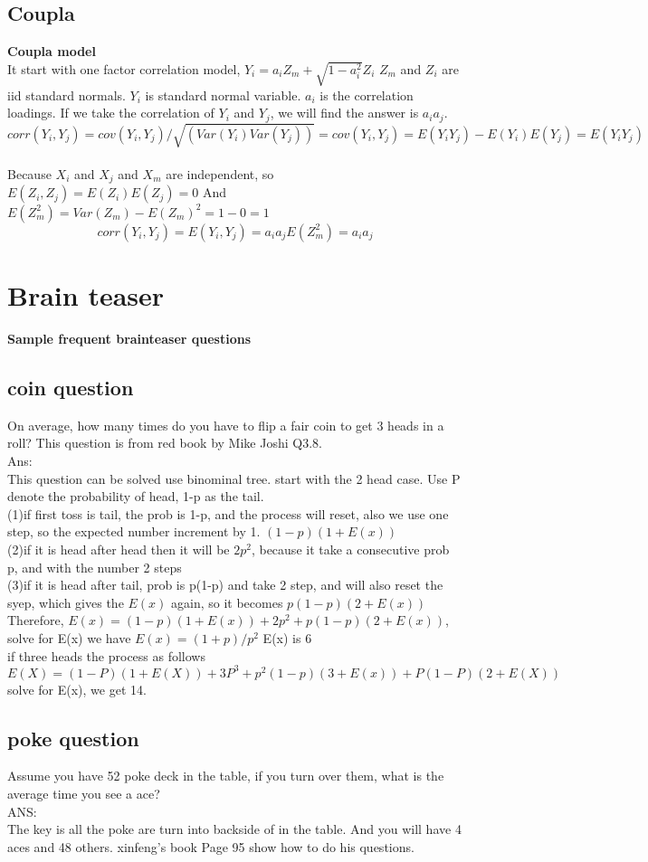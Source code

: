 \documentclass[a4paper,11pt]{article}
\begin{document}
\subsection{Coupla}
{\bf Coupla model}\\
It start with one factor correlation model, $Y_i=a_iZ_m+\sqrt {1-a_i^2}Z_i$ $Z_m$ and $Z_i$ are iid standard normals.
$Y_i$ is standard normal variable. $a_i$ is the correlation loadings. If we take the correlation of $Y_i$ and $Y_j$, we will find the answer is $a_i a_j$.
$$
corr(Y_i,Y_j)=cov(Y_i,Y_j)/\sqrt {(Var(Y_i)Var(Y_j))}=cov(Y_i,Y_j)=E(Y_iY_j)-E(Y_i)E(Y_j)=E(Y_i Y_j)
$$\\
Because $X_i$ and $X_j$ and $X_m$ are independent, so $E(Z_i,Z_j)=E(Z_i)E(Z_j)=0$ And $E(Z_m^2)=Var(Z_m)-E(Z_m)^2=1-0=1$
$$
corr(Y_i,Y_j)=E(Y_i,Y_j)=a_ia_jE(Z_m^2)=a_ia_j
$$
\section{Brain teaser}
{\bf Sample frequent brainteaser questions}\\
\subsection{coin question}
On average, how many times do you have to flip a fair coin to get 3 heads in a roll?
This question is from red book by Mike Joshi Q3.8.\\
Ans:\\
This question can be solved use binominal tree. start with the 2 head case. Use P denote the probability of head, 1-p as the tail.\\
(1)if first toss is tail, the prob is 1-p, and the process will reset, also we use one step, so the expected number increment by 1. $(1-p)(1+E(x))$\\
(2)if it is head after head then it will be $2p^2$, because it take a consecutive prob p, and with the number 2 steps\\
(3)if it is head after tail, prob is p(1-p) and take 2 step, and will also reset the syep, which gives the $E(x)$ again, so it becomes $p(1-p)(2+E(x))$\\
Therefore, $E(x)=(1-p)(1+E(x))+2p^2+p(1-p)(2+E(x))$, solve for E(x) we have $E(x)=(1+p)/p^2$ E(x) is 6\\
if three heads the process as follows $E(X)=(1-P)(1+E(X))+3P^3+p^2(1-p)(3+E(x))+P(1-P)(2+E(X))$ solve for E(x), we get 14.\\
\subsection{poke question}
Assume you have 52 poke deck in the table, if you turn over them, what is the average time you see a ace?\\
ANS:\\
The key is all the poke are turn into backside of in the table. And you will have 4 aces and 48 others. xinfeng's book Page 95 show how to do his questions.\\
\end{document}
